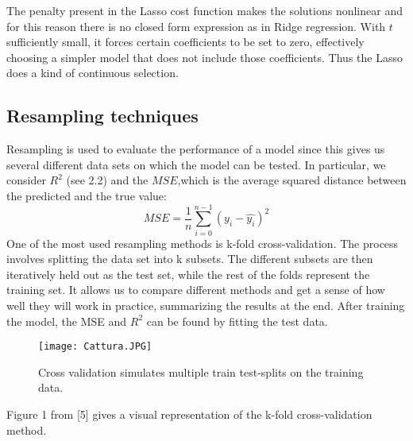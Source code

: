 \documentclass{emulateapj}
\begin{document}
The penalty present in the Lasso cost function makes the solutions nonlinear and for this reason there is no closed form expression as in Ridge regression. With $t$ sufficiently small, it forces certain coefficients to be set to zero, effectively choosing a simpler model that does not include those coefficients. Thus the Lasso does a kind of continuous selection.
\subsection{Resampling techniques}
Resampling is used to evaluate the performance of a model since this gives us several different data sets on which the model can be tested.  In particular, we consider $R^2$ (see 2.2) and the $MSE$,which is the average squared distance between the predicted and the true value: 
\begin{equation}
MSE=\frac{1}{n}\sum\limits_{i=0}^{n-1}(y_i-\hat{y_i})^2
\end{equation}
One of the most used resampling methods is k-fold cross-validation. The process involves splitting the data set into k subsets. The different subsets are then iteratively held out as the test set, while the rest of the folds represent the training set. It allows us to compare different methods and get a sense of how well they will work in practice, summarizing the results at the end. After training the model, the MSE and $R^2$
can be found by fitting the test data.
\begin{figure}[h]
\caption{Cross validation simulates multiple train test-splits on the training data.}
\centering
\texttt{[image: Cattura.JPG]}
\end{figure}
Figure 1 from [5] gives a visual representation of the k-fold cross-validation method.
\end{document}
